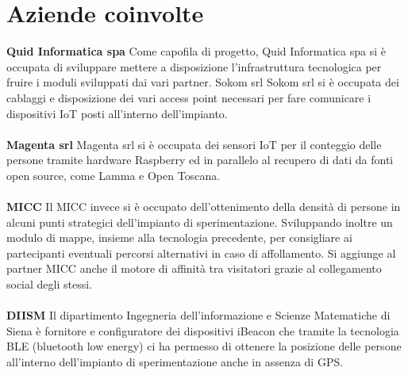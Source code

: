 \paragraph{}

\section{Aziende coinvolte}

\textbf{Quid Informatica spa}
Come capofila di progetto, Quid Informatica spa si è occupata di sviluppare mettere a disposizione l’infrastruttura tecnologica per fruire i moduli sviluppati dai vari partner.
Sokom srl
Sokom srl si è occupata dei cablaggi e disposizione dei vari access point necessari per fare comunicare i dispositivi IoT posti all’interno dell’impianto.
\paragraph{}

\textbf{Magenta srl}
Magenta srl si è occupata dei sensori IoT per il conteggio delle persone tramite hardware Raspberry ed in parallelo al recupero di dati da fonti open source, come Lamma e Open Toscana.
\paragraph{}

\textbf{MICC}
Il MICC invece si è occupato dell’ottenimento della densità di persone in alcuni punti strategici dell’impianto di sperimentazione. Sviluppando inoltre un modulo di mappe, insieme alla tecnologia precedente, per consigliare ai partecipanti eventuali percorsi alternativi in caso di affollamento.
Si aggiunge al partner MICC anche il motore di affinità tra visitatori grazie al collegamento social degli stessi.
\paragraph{}

\textbf{DIISM}
Il dipartimento Ingegneria dell’informazione e Scienze Matematiche di Siena è fornitore e configuratore dei dispositivi iBeacon che tramite la tecnologia BLE (bluetooth low energy) ci ha permesso di ottenere la posizione delle persone all’interno dell’impianto di sperimentazione anche in assenza di GPS.
\paragraph{}

